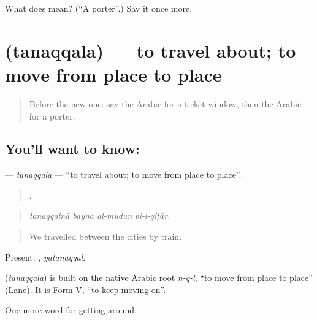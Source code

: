 \begin{tcolorbox}[breakable,colback=teal!4,colframe=teal!35!black,title={Before you move on}]
What does  mean? (\textquotedblleft{}A porter\textquotedblright{}.) Say it once more.
\end{tcolorbox}
\section[\texorpdfstring{\ar{تنقل} (tanaqqala)}{تنقل (tanaqqala)}]{ (tanaqqala) — to travel about; to move from place to place}

\label{lesson:AR-C436-tanaqqala}



\begin{quote}
Before the new one: say the Arabic for a ticket window, then the Arabic for a porter.
\end{quote}

\subsection*{You'll want to know: }
\textbf{} — \emph{tanaqqala} — \textquotedblleft{}to travel about; to move from place to place\textquotedblright{}.

\begin{quote}
   .
\end{quote}

\begin{quote}
\emph{tanaqqalnā bayna al-mudun bi-l-qiṭār.}
\end{quote}

\begin{quote}
We travelled between the cities by train.
\end{quote}

Present: , \emph{yatanaqqal}.

\begin{cousinweb}
\textbf{} (\emph{tanaqqala}) is built on the native Arabic root \emph{n-q-l}, \textquotedblleft{}to move from place to place\textquotedblright{} (Lane). It is Form V, \textquotedblleft{}to keep moving on\textquotedblright{}.
\end{cousinweb}

\begin{grammarlens}[title={What you've built}]
One more word for getting around.
\end{grammarlens}

